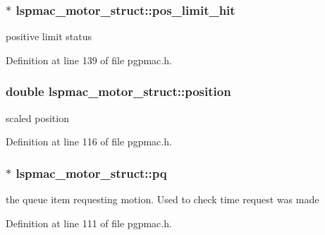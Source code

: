 \hypertarget{structlspmac__motor__struct_af39d2e7a681d7c2fbdc39d53fab1a475}{
\subsubsection[{pos\-\_\-limit\-\_\-hit}]{$\ast$ lspmac\-\_\-motor\-\_\-struct\-::pos\-\_\-limit\-\_\-hit}}\label{structlspmac__motor__struct_af39d2e7a681d7c2fbdc39d53fab1a475}


positive limit status 



Definition at line 139 of file pgpmac.\-h.

\hypertarget{structlspmac__motor__struct_af8ffb3aed907d8664b65b37601954411}{
\subsubsection[{position}]{\setlength{\rightskip}{0pt plus 5cm}double lspmac\-\_\-motor\-\_\-struct\-::position}}\label{structlspmac__motor__struct_af8ffb3aed907d8664b65b37601954411}


scaled position 



Definition at line 116 of file pgpmac.\-h.

\hypertarget{structlspmac__motor__struct_a8caf0031e134e144bffc87d9d896d15b}{
\subsubsection[{pq}]{$\ast$ lspmac\-\_\-motor\-\_\-struct\-::pq}}\label{structlspmac__motor__struct_a8caf0031e134e144bffc87d9d896d15b}


the queue item requesting motion. Used to check time request was made 



Definition at line 111 of file pgpmac.\-h.

